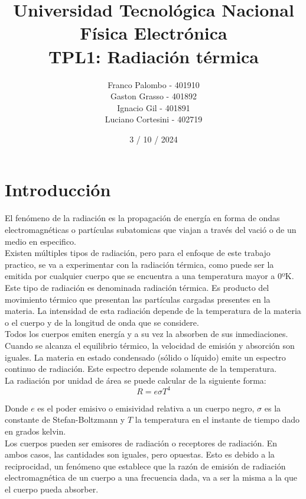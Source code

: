 \documentclass[a4paper,12pt]{report}
\title{%
  \fontsize{25}{0}\selectfont Universidad Tecnológica Nacional \\
  \fontsize{22}{30}\selectfont Física Electrónica \\
  \fontsize{18}{25}\selectfont TPL1: Radiación térmica
}
\author{
Franco Palombo - 401910\\
Gaston Grasso - 401892\\
Ignacio Gil - 401891\\
Luciano Cortesini - 402719\\
}
\date{3 / 10 / 2024}
\begin{document}
\maketitle

\chapter{Introducción}
  El fenómeno de la radiación es la propagación de energía en forma de ondas electromagnéticas o partículas subatomicas
  que viajan a través del vació o de un medio en especifico.\\

  Existen múltiples tipos de radiación, pero para el enfoque de este trabajo practico, se va a experimentar con la
  radiación térmica, como puede ser la emitida por cualquier cuerpo que se encuentra a una temperatura mayor a 0ºK.
  Este tipo de radiación es denominada radiación térmica. Es producto del movimiento térmico que presentan las
  partículas cargadas presentes en la materia. La intensidad de esta radiación depende de la temperatura de la materia
  o el cuerpo y de la longitud de onda que se considere.\\

  Todos los cuerpos emiten energía y a su vez la absorben de sus inmediaciones. Cuando se alcanza el equilibrio térmico,
  la velocidad de emisión y absorción son iguales. La materia en estado condensado (sólido o líquido) emite un espectro
  continuo de radiación. Este espectro depende solamente de la temperatura.\\

  La radiación por unidad de área se puede calcular de la siguiente forma:
  \begin{equation}
    R = e \sigma T^4
  \end{equation}

  Donde $e$ es el poder emisivo o emisividad relativa a un cuerpo negro, $\sigma$ es la constante de Stefan-Boltzmann y
  $T$ la temperatura en el instante de tiempo dado en grados kelvin.\\

  Los cuerpos pueden ser emisores de radiación o receptores de radiación. En ambos casos, las cantidades son iguales,
  pero opuestas. Esto es debido a la reciprocidad, un fenómeno que establece que la razón de emisión de radiación
  electromagnética de un cuerpo a una frecuencia dada, va a ser la misma a la que el cuerpo pueda absorber.\\
\end{document}

